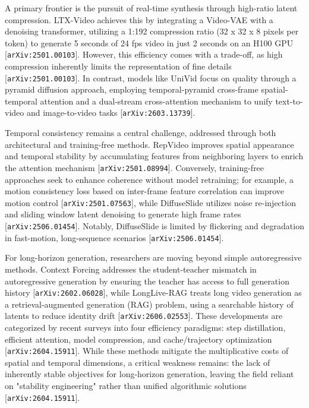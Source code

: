 \documentclass[11pt]{article}
\begin{document}
A primary frontier is the pursuit of real-time synthesis through high-ratio latent compression. LTX-Video achieves this by integrating a Video-VAE with a denoising transformer, utilizing a 1:192 compression ratio (32 x 32 x 8 pixels per token) to generate 5 seconds of 24 fps video in just 2 seconds on an H100 GPU [\texttt{arXiv:2501.00103}]. However, this efficiency comes with a trade-off, as high compression inherently limits the representation of fine details [\texttt{arXiv:2501.00103}]. In contrast, models like UniVid focus on quality through a pyramid diffusion approach, employing temporal-pyramid cross-frame spatial-temporal attention and a dual-stream cross-attention mechanism to unify text-to-video and image-to-video tasks [\texttt{arXiv:2603.13739}].

Temporal consistency remains a central challenge, addressed through both architectural and training-free methods. RepVideo improves spatial appearance and temporal stability by accumulating features from neighboring layers to enrich the attention mechanism [\texttt{arXiv:2501.08994}]. Conversely, training-free approaches seek to enhance coherence without model retraining; for example, a motion consistency loss based on inter-frame feature correlation can improve motion control [\texttt{arXiv:2501.07563}], while DiffuseSlide utilizes noise re-injection and sliding window latent denoising to generate high frame rates [\texttt{arXiv:2506.01454}]. Notably, DiffuseSlide is limited by flickering and degradation in fast-motion, long-sequence scenarios [\texttt{arXiv:2506.01454}].

For long-horizon generation, researchers are moving beyond simple autoregressive methods. Context Forcing addresses the student-teacher mismatch in autoregressive generation by ensuring the teacher has access to full generation history [\texttt{arXiv:2602.06028}], while LongLive-RAG treats long video generation as a retrieval-augmented generation (RAG) problem, using a searchable history of latents to reduce identity drift [\texttt{arXiv:2606.02553}]. These developments are categorized by recent surveys into four efficiency paradigms: step distillation, efficient attention, model compression, and cache/trajectory optimization [\texttt{arXiv:2604.15911}]. While these methods mitigate the multiplicative costs of spatial and temporal dimensions, a critical weakness remains: the lack of inherently stable objectives for long-horizon generation, leaving the field reliant on "stability engineering" rather than unified algorithmic solutions [\texttt{arXiv:2604.15911}].
\end{document}
